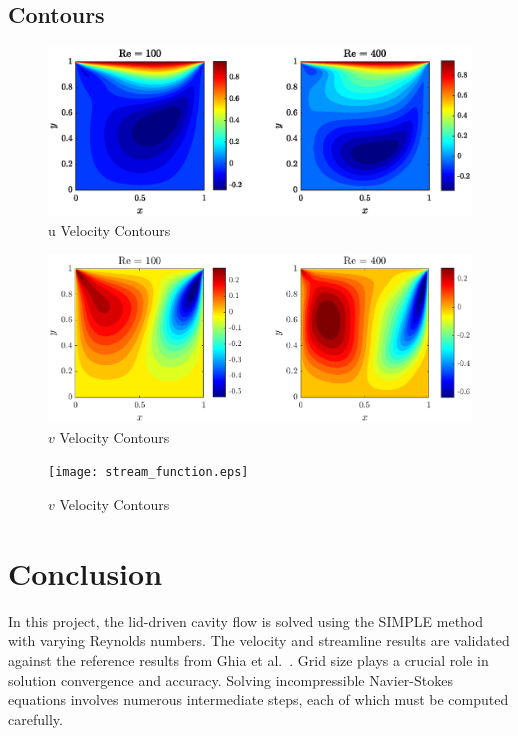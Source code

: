 \documentclass{article}
\numberwithin{equation}{section}
\numberwithin{figure}{section}
\begin{document}
\subsection{Contours}
\begin{figure}
    \centering
    \includegraphics[trim=60 0 60 0, clip]{u_velocity.eps}
    \caption{u Velocity Contours}
    \label{fig:u_velocity}
\end{figure}
\begin{figure}
    \centering
    \includegraphics[trim=60 0 60 0, clip]{v_velocity.eps}
    \caption{$v$ Velocity Contours}
    \label{fig:v_velocity}
\end{figure}
\begin{figure}
    \centering
    \texttt{[image: stream\_function.eps]}
    \caption{$v$ Velocity Contours}
    \label{fig:v_velocity}
\end{figure}



\section{Conclusion}
In this project, the lid-driven cavity flow is solved using the SIMPLE method with varying Reynolds numbers. The velocity and streamline results are validated against the reference results from Ghia et al.~\cite{ghia1982high}. Grid size plays a crucial role in solution convergence and accuracy. Solving incompressible Navier-Stokes equations involves numerous intermediate steps, each of which must be computed carefully.
\end{document}
